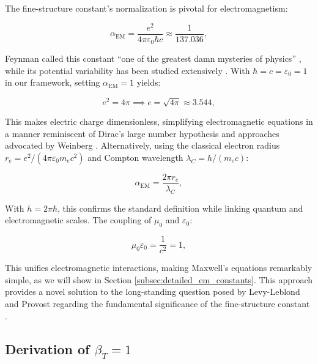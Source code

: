 \documentclass[twocolumn,aps,prl]{revtex4-2}
\begin{document}
	The fine-structure constant’s normalization is pivotal for electromagnetism:
	
	\begin{equation}
		\alpha_{\text{EM}} = \frac{e^2}{4 \pi \varepsilon_0 \hbar c} \approx \frac{1}{137.036}, \label{eq:fine_structure}
	\end{equation}
	
	Feynman called this constant “one of the greatest damn mysteries of physics” \cite{Feynman1985}, while its potential variability has been studied extensively \cite{Webb2011, Rosenband2008}. With $\hbar = c = \varepsilon_0 = 1$ in our framework, setting $\alpha_{\text{EM}} = 1$ yields:
	
	\begin{equation}
		e^2 = 4 \pi \implies e = \sqrt{4 \pi} \approx 3.544, \label{eq:charge_value}
	\end{equation}
	
	This makes electric charge dimensionless, simplifying electromagnetic equations in a manner reminiscent of Dirac’s large number hypothesis \cite{Dirac1937} and approaches advocated by Weinberg \cite{Weinberg1983}. Alternatively, using the classical electron radius $r_e = e^2/(4 \pi \varepsilon_0 m_e c^2)$ and Compton wavelength $\lambda_C = h/(m_e c)$:
	
	\begin{equation}
		\alpha_{\text{EM}} = \frac{2 \pi r_e}{\lambda_C}, \label{eq:alpha_alt}
	\end{equation}
	
	With $h = 2 \pi \hbar$, this confirms the standard definition while linking quantum and electromagnetic scales. The coupling of $\mu_0$ and $\varepsilon_0$:
	
	\begin{equation}
		\mu_0 \varepsilon_0 = \frac{1}{c^2} = 1, \label{eq:em_coupling}
	\end{equation}
	
	This unifies electromagnetic interactions, making Maxwell’s equations remarkably simple, as we will show in Section \ref{subsec:detailed_em_constants}. This approach provides a novel solution to the long-standing question posed by Levy-Leblond and Provost regarding the fundamental significance of the fine-structure constant \cite{LevyLeblond1979}.
	
	\subsection{Derivation of $\beta_T = 1$}
	\label{subsec:beta_derivation}
	
\end{document}
